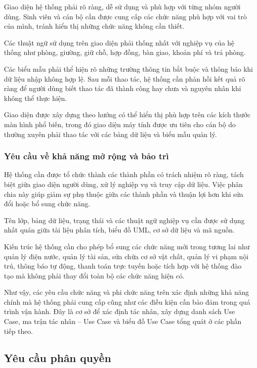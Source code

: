 Giao diện hệ thống phải rõ ràng, dễ sử dụng và phù hợp với từng nhóm người dùng. Sinh viên và cán bộ cần được cung cấp các chức năng phù hợp với vai trò của mình, tránh hiển thị những chức năng không cần thiết.

Các thuật ngữ sử dụng trên giao diện phải thống nhất với nghiệp vụ của hệ thống như phòng, giường, giữ chỗ, hợp đồng, bàn giao, khoản phí và trả phòng.

Các biểu mẫu phải thể hiện rõ những trường thông tin bắt buộc và thông báo khi dữ liệu nhập không hợp lệ. Sau mỗi thao tác, hệ thống cần phản hồi kết quả rõ ràng để người dùng biết thao tác đã thành công hay chưa và nguyên nhân khi không thể thực hiện.

Giao diện được xây dựng theo hướng có thể hiển thị phù hợp trên các kích thước màn hình phổ biến, trong đó giao diện máy tính được ưu tiên cho cán bộ do thường xuyên phải thao tác với các bảng dữ liệu và biểu mẫu quản lý.

\subsubsection{Yêu cầu về khả năng mở rộng và bảo trì}

Hệ thống cần được tổ chức thành các thành phần có trách nhiệm rõ ràng, tách biệt giữa giao diện người dùng, xử lý nghiệp vụ và truy cập dữ liệu. Việc phân chia này giúp giảm sự phụ thuộc giữa các thành phần và thuận lợi hơn khi sửa đổi hoặc bổ sung chức năng.

Tên lớp, bảng dữ liệu, trạng thái và các thuật ngữ nghiệp vụ cần được sử dụng nhất quán giữa tài liệu phân tích, biểu đồ UML, cơ sở dữ liệu và mã nguồn.

Kiến trúc hệ thống cần cho phép bổ sung các chức năng mới trong tương lai như quản lý điện nước, quản lý tài sản, sửa chữa cơ sở vật chất, quản lý vi phạm nội trú, thông báo tự động, thanh toán trực tuyến hoặc tích hợp với hệ thống đào tạo mà không phải thay đổi toàn bộ các chức năng hiện có.

Như vậy, các yêu cầu chức năng và phi chức năng trên xác định những khả năng chính mà hệ thống phải cung cấp cũng như các điều kiện cần bảo đảm trong quá trình vận hành. Đây là cơ sở để xác định tác nhân, xây dựng danh sách Use Case, ma trận tác nhân – Use Case và biểu đồ Use Case tổng quát ở các phần tiếp theo.

\subsection{Yêu cầu phân quyền}

